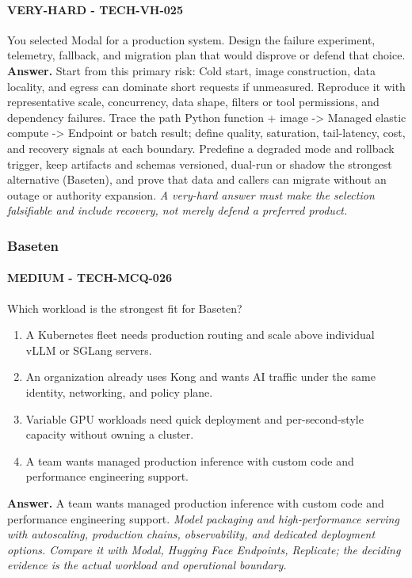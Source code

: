 \paragraph{VERY-HARD - TECH-VH-025} You selected Modal for a production system. Design the failure experiment, telemetry, fallback, and migration plan that would disprove or defend that choice.
\textbf{Answer.} Start from this primary risk: Cold start, image construction, data locality, and egress can dominate short requests if unmeasured. Reproduce it with representative scale, concurrency, data shape, filters or tool permissions, and dependency failures. Trace the path Python function + image -> Managed elastic compute -> Endpoint or batch result; define quality, saturation, tail-latency, cost, and recovery signals at each boundary. Predefine a degraded mode and rollback trigger, keep artifacts and schemas versioned, dual-run or shadow the strongest alternative (Baseten), and prove that data and callers can migrate without an outage or authority expansion.
\textit{A very-hard answer must make the selection falsifiable and include recovery, not merely defend a preferred product.}
\subsubsection*{Baseten}
\paragraph{MEDIUM - TECH-MCQ-026} Which workload is the strongest fit for Baseten?
\begin{enumerate}[label=\Alph*.]
\item A Kubernetes fleet needs production routing and scale above individual vLLM or SGLang servers.
\item An organization already uses Kong and wants AI traffic under the same identity, networking, and policy plane.
\item Variable GPU workloads need quick deployment and per-second-style capacity without owning a cluster.
\item A team wants managed production inference with custom code and performance engineering support.
\end{enumerate}
\textbf{Answer.} A team wants managed production inference with custom code and performance engineering support.
\textit{Model packaging and high-performance serving with autoscaling, production chains, observability, and dedicated deployment options. Compare it with Modal, Hugging Face Endpoints, Replicate; the deciding evidence is the actual workload and operational boundary.}
